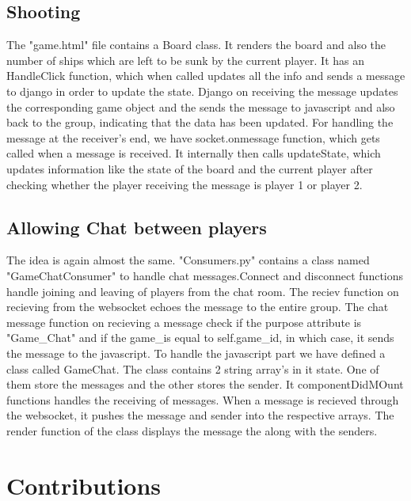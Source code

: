 \documentclass[titlepage]{article}
\begin{document}
\subsection{Shooting}
The "game.html" file contains a Board class. It renders the board and also the number of ships which are left to be sunk by the current player. It has an HandleClick function, which when called updates all the info and sends a message to django in order to update the state. Django on receiving the message updates the corresponding game object and the sends the message to javascript and also back to the group, indicating that the data has been updated. 
For handling the message at the receiver's end, we have socket.onmessage function, which gets called when a message is received. It internally then calls updateState, which updates information like the state of the board and the current player after checking whether the player receiving the message is player 1 or player 2.
\subsection{Allowing Chat between players}
The idea is again almost the same. "Consumers.py" contains a class named "GameChatConsumer" to handle chat messages.Connect and disconnect functions handle joining and leaving of players from the chat room. The reciev function on recieving from the websocket echoes the message to the entire group. The chat message function on recieving a message check if the purpose attribute is "Game\_Chat" and if the game\_is equal to self.game\_id, in which case, it sends the message to the javascript. To handle the javascript part we have defined a class called GameChat. The class contains 2 string array's in it state. One of them store the messages and the other stores the sender. It componentDidMOunt functions handles the receiving of messages. When a message is recieved through the websocket, it pushes the message and sender into the respective arrays. The render function of the class displays the message the along with the senders. 
\section{Contributions}
\end{document}

